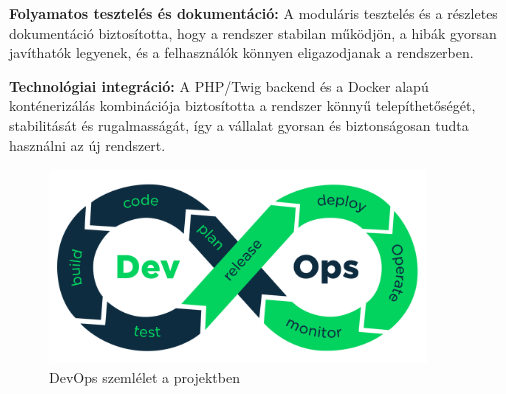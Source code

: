 \textbf{Folyamatos tesztelés és dokumentáció:}  
A moduláris tesztelés és a részletes dokumentáció biztosította, hogy a rendszer stabilan működjön, 
a hibák gyorsan javíthatók legyenek, és a felhasználók könnyen eligazodjanak a rendszerben.

\textbf{Technológiai integráció:}  
A PHP/Twig backend és a Docker alapú konténerizálás kombinációja biztosította a rendszer könnyű telepíthetőségét, 
stabilitását és rugalmasságát, így a vállalat gyorsan és biztonságosan tudta használni az új rendszert.
\begin{figure}[H]
    \centering
    \includegraphics[width=100mm, keepaspectratio]{figures/devops.png}
    \caption{DevOps szemlélet a projektben}
    \label{fig:devops}
\end{figure}
